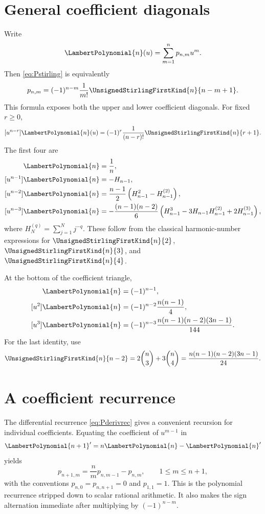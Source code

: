 \documentclass[11pt,oneside,openany]{book}
\begin{document}
\section{General coefficient diagonals}
Write
\[
 \LambertPolynomial{n}(u)=\sum_{m=1}^np_{n,m}u^m.
\]
Then \cref{eq:Pstirling} is equivalently
\begin{equation}\label{eq:pnmappendix}
 p_{n,m}=(-1)^{n-m}\frac{1}{m!}
 \UnsignedStirlingFirstKind{n}{n-m+1}.
\end{equation}
This formula exposes both the upper and lower coefficient diagonals.
For fixed \(r\geq0\),
\begin{equation}\label{eq:upperdiagonal}
 [u^{n-r}]\LambertPolynomial{n}(u)
 =(-1)^r\frac{1}{(n-r)!}\UnsignedStirlingFirstKind{n}{r+1}.
\end{equation}
The first four are
\begin{align}
 [u^n]\LambertPolynomial{n}&=\frac1n,
 \label{eq:diagtop0}\\
 [u^{n-1}]\LambertPolynomial{n}&=-H_{n-1},
 \label{eq:diagtop1}\\
 [u^{n-2}]\LambertPolynomial{n}
 &=\frac{n-1}{2}\left(H_{n-1}^2-H_{n-1}^{(2)}\right),
 \label{eq:diagtop2}\\
 [u^{n-3}]\LambertPolynomial{n}
 &=-\frac{(n-1)(n-2)}{6}
 \left(H_{n-1}^3-3H_{n-1}H_{n-1}^{(2)}
       +2H_{n-1}^{(3)}\right),
 \label{eq:diagtop3}
\end{align}
where
\(H_N^{(q)}=\sum_{j=1}^Nj^{-q}\).
These follow from the classical harmonic-number expressions for
\(\UnsignedStirlingFirstKind{n}{2}\), \(\UnsignedStirlingFirstKind{n}{3}\), and
\(\UnsignedStirlingFirstKind{n}{4}\).

At the bottom of the coefficient triangle,
\begin{align}
 [u]\LambertPolynomial{n}&=(-1)^{n-1},
 \label{eq:diagbottom1}\\
 [u^2]\LambertPolynomial{n}&=(-1)^{n-2}\frac{n(n-1)}4,
 \label{eq:diagbottom2}\\
 [u^3]\LambertPolynomial{n}&=(-1)^{n-3}
 \frac{n(n-1)(n-2)(3n-1)}{144}.
 \label{eq:diagbottom3}
\end{align}
For the last identity, use
\[
 \UnsignedStirlingFirstKind{n}{n-2}
 =2\binom n3+3\binom n4
 =\frac{n(n-1)(n-2)(3n-1)}{24}.
\]

\section{A coefficient recurrence}
The differential recurrence \cref{eq:Pderivrec} gives a convenient recursion
for individual coefficients.  Equating the coefficient of \(u^{m-1}\) in
\[
 \LambertPolynomial{n+1}'=n\LambertPolynomial{n}-\LambertPolynomial{n}'
\]
yields
\begin{equation}\label{eq:pnmrecurrence}
 p_{n+1,m}
 =\frac{n}{m}p_{n,m-1}-p_{n,m},
 \qquad 1\leq m\leq n+1,
\end{equation}
with the conventions \(p_{n,0}=p_{n,n+1}=0\) and \(p_{1,1}=1\).
This is the polynomial recurrence stripped down to scalar rational arithmetic.
It also makes the sign alternation immediate after multiplying by
\((-1)^{n-m}\).
\end{document}
